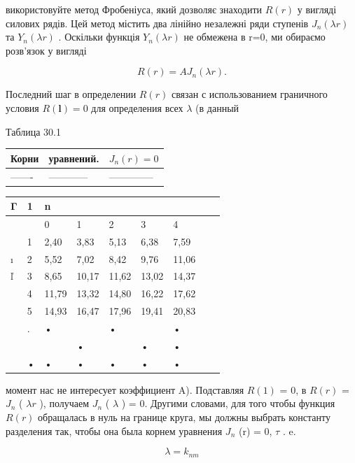 \documentclass[
  ukrainian,
]{article}
\newcounter{none} %
\begin{document}
використовуйте метод Фробеніуса, який дозволяє знаходити \(R(r)\) у
вигляді силових рядів. Цей метод містить два лінійно незалежні ряди
ступенів \(J_n(\lambda r)\) та \(Y_n(\lambda r)\) . Оскільки функція
\(Y_n(\lambda r)\) не обмежена в r=0, ми обираємо розв'язок у вигляді

\[
R(r) = AJ_n(\lambda r).
\]

Последний шаг в определении \(R\left( r\right)\) связан с использованием
граничного условия \(R\left( \mathbf{l}\right) =0\) для определения всех
\(\lambda\) (в данный

Таблица 30.1

{\def\LTcaptype{none} %
\begin{longtable}[]{@{}lll@{}}
\toprule\noalign{}
Корни & уравнений. & \(J_n(r) = 0\) \\
\midrule\noalign{}
\endhead
\bottomrule\noalign{}
\endlastfoot
------- & ------------ & -------------- \\
\end{longtable}
}

{\def\LTcaptype{none} %
\begin{longtable}[]{@{}lllllllll@{}}
\toprule\noalign{}
Γ & 1 & n & & & & & & \\
\midrule\noalign{}
\endhead
\bottomrule\noalign{}
\endlastfoot
& & 0 & 1 & 2 & 3 & 4 & & \\
& 1 & 2,40 & 3,83 & 5,13 & 6,38 & 7,59 & & \\
ı & 2 & 5,52 & 7,02 & 8,42 & 9,76 & 11,06 & & \\
ľ & 3 & 8,65 & 10,17 & 11,62 & 13,02 & 14,37 & & \\
& 4 & 11,79 & 13,32 & 14,80 & 16,22 & 17,62 & & \\
& 5 & 14,93 & 16,47 & 17,96 & 19,41 & 20,83 & & \\
& . & • & & • & & • & & \\
& & & • & & • & • & & \\
& • & • & • & • & • & • & & \\
\end{longtable}
}

момент нас не интересует коэффициент A). Подставляя \(R (1)\) = 0, в
\(R (r)\) = \(J_n\) ( \(\lambda r\) ), получаем \(J_n\) ( \(\lambda\) )
= 0. Другими словами, для того чтобы функция \(R (r)\) обращалась в нуль
на границе круга, мы должны выбрать константу разделения так, чтобы она
была корнем уравнения \(J_n\) (r) = 0, \(\tau\) . e.

\[
\lambda = k_{nm}
\]
\end{document}
